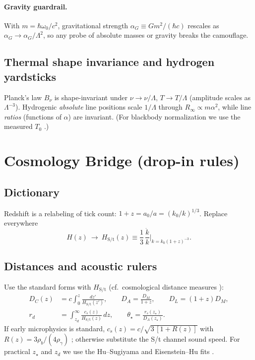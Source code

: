 \documentclass[11pt,oneside]{article}
\begin{document}
\paragraph{Gravity guardrail.}
With $m=\hbar\omega_0/c^2$, gravitational strength $\alpha_G\equiv Gm^2/(\hbar c)$ rescales as $\alpha_G\to \alpha_G/\Lambda^2$,
so any probe of absolute masses or gravity breaks the camouflage.

\subsection{Thermal shape invariance and hydrogen yardsticks}
Planck's law $B_\nu$ is shape-invariant under $\nu\to \nu/\Lambda$, $T\to T/\Lambda$ (amplitude scales as $\Lambda^{-3}$).
Hydrogenic \emph{absolute} line positions scale $1/\Lambda$ through $R_\infty\propto m\alpha^2$, while line \emph{ratios} (functions of $\alpha$) are invariant.
(For blackbody normalization we use the measured $T_0$ \cite{fixsen2009}.)

\section{Cosmology Bridge (drop-in rules)}
\subsection{Dictionary}
Redshift is a relabeling of tick count: $1+z=a_0/a=(k_0/k)^{1/3}$.
Replace everywhere
\begin{equation*}
H(z)\ \longrightarrow\ H_{\text{S/t}}(z)\equiv \frac{1}{3}\,\frac{\dot k}{k}\Big|_{k=k_0(1+z)^{-3}}.
\end{equation*}

\subsection{Distances and acoustic rulers}
Use the standard forms with $H_{\text{S/t}}$ (cf.\ cosmological distance measures \cite{hogg1999}):
\begin{align*}
D_C(z)&=c\int_0^{z}\frac{dz'}{H_{\text{S/t}}(z')},\qquad
D_A=\frac{D_M}{1+z},\qquad D_L=(1+z)D_M,\\
r_d&=\int_{z_d}^{\infty}\frac{c_s(z)}{H_{\text{S/t}}(z)}\,dz,\qquad
\theta_\star=\frac{r_s(z_\star)}{D_A(z_\star)}.
\end{align*}
If early microphysics is standard, $c_s(z)=c/\sqrt{3\,[1+R(z)]}$ with $R(z)=3\rho_b/(4\rho_\gamma)$ \cite{husugiyama1996,eisenstein1998}; otherwise substitute the S/t channel sound speed.
For practical $z_\star$ and $z_d$ we use the Hu--Sugiyama and Eisenstein--Hu fits \cite{husugiyama1996,eisenstein1998}.
\end{document}
